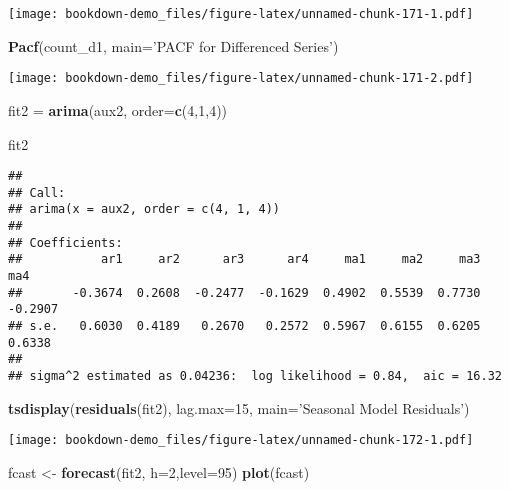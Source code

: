 \documentclass[]{book}
\newenvironment{Shaded}{\begin{snugshade}}{\end{snugshade}}
\newcommand{\KeywordTok}[1]{\textcolor[rgb]{0.13,0.29,0.53}{\textbf{#1}}}
\newcommand{\DataTypeTok}[1]{\textcolor[rgb]{0.13,0.29,0.53}{#1}}
\newcommand{\DecValTok}[1]{\textcolor[rgb]{0.00,0.00,0.81}{#1}}
\newcommand{\StringTok}[1]{\textcolor[rgb]{0.31,0.60,0.02}{#1}}
\newcommand{\NormalTok}[1]{#1}
\theoremstyle{definition}
\theoremstyle{definition}
\theoremstyle{definition}
\theoremstyle{remark}
\begin{document}
\texttt{[image: bookdown-demo\_files/figure-latex/unnamed-chunk-171-1.pdf]}

\begin{Shaded}
\begin{Highlighting}[]
\KeywordTok{Pacf}\NormalTok{(count_d1, }\DataTypeTok{main=}\StringTok{'PACF for Differenced Series'}\NormalTok{)}
\end{Highlighting}
\end{Shaded}

\texttt{[image: bookdown-demo\_files/figure-latex/unnamed-chunk-171-2.pdf]}

\begin{Shaded}
\begin{Highlighting}[]
\NormalTok{fit2 =}\StringTok{ }\KeywordTok{arima}\NormalTok{(aux2, }\DataTypeTok{order=}\KeywordTok{c}\NormalTok{(}\DecValTok{4}\NormalTok{,}\DecValTok{1}\NormalTok{,}\DecValTok{4}\NormalTok{))}

\NormalTok{fit2}
\end{Highlighting}
\end{Shaded}

\begin{verbatim}
## 
## Call:
## arima(x = aux2, order = c(4, 1, 4))
## 
## Coefficients:
##           ar1     ar2      ar3      ar4     ma1     ma2     ma3      ma4
##       -0.3674  0.2608  -0.2477  -0.1629  0.4902  0.5539  0.7730  -0.2907
## s.e.   0.6030  0.4189   0.2670   0.2572  0.5967  0.6155  0.6205   0.6338
## 
## sigma^2 estimated as 0.04236:  log likelihood = 0.84,  aic = 16.32
\end{verbatim}

\begin{Shaded}
\begin{Highlighting}[]
\KeywordTok{tsdisplay}\NormalTok{(}\KeywordTok{residuals}\NormalTok{(fit2), }\DataTypeTok{lag.max=}\DecValTok{15}\NormalTok{, }\DataTypeTok{main=}\StringTok{'Seasonal Model Residuals'}\NormalTok{)}
\end{Highlighting}
\end{Shaded}

\texttt{[image: bookdown-demo\_files/figure-latex/unnamed-chunk-172-1.pdf]}

\begin{Shaded}
\begin{Highlighting}[]
\NormalTok{fcast <-}\StringTok{ }\KeywordTok{forecast}\NormalTok{(fit2, }\DataTypeTok{h=}\DecValTok{2}\NormalTok{,}\DataTypeTok{level=}\DecValTok{95}\NormalTok{)}
\KeywordTok{plot}\NormalTok{(fcast)}
\end{Highlighting}
\end{Shaded}
\end{document}

